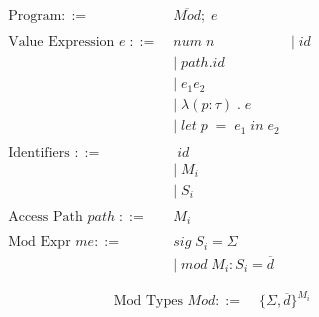 \documentclass[10pt,a4paper,master=cws, masteroption=ai,english,inputenc=utf8]{kulemt}
\begin{document}
\begin{figure}[!htb]
\begin{align*}
\begin{aligned}
\text{Program} ::= \; & \overline{\mathit{Mod}};\;e\\
\\
\text{Value Expression }e \; ::= \; &\mathit{num \; n \;} %
&|\;\mathit{id}  \\
&|\;\mathit{path.id} \\
&|\;e_{1}e_{2} \\
&|\;\lambda(p:\tau)\;.\;e \\
&|\;\mathit{let }\; p \; = \; e_{1} \; in \; e_{2} \\
\\
\text{Identifiers } ::= \; & \; id \\ 
&|\;M_{i}\\
&|\;S_{i}\\
\\
\text{Access Path } \mathit{path} \; ::= \; &\mathit{M_{i}}\\
\\
\text{Mod Expr } \mathit{me} ::= \; & \mathit{sig} \; S_{i} = \Sigma\\
&|\; \mathit{mod} \;  M_{i} : S_{i} = \overline{\mathit{d}} \\
\\
\end{aligned}
\begin{aligned}
\text{Mod Types } \mathit{Mod} ::=\;&\lbrace \Sigma, \overline{\mathit{d}} \rbrace^{M_{i}} \\
\\

\end{aligned}
\end{align*}
\end{figure}
\end{document}
